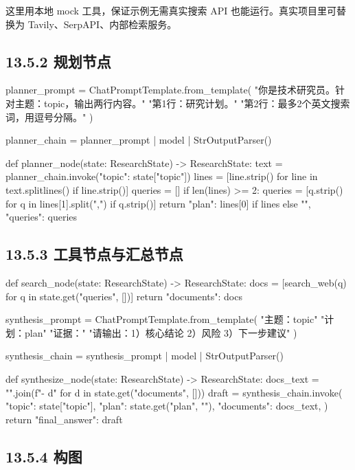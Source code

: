 这里用本地 mock 工具，保证示例无需真实搜索 API 也能运行。真实项目里可替换为 Tavily、SerpAPI、内部检索服务。


\subsection{13.5.2 规划节点}

\begin{codeblock}
planner_prompt = ChatPromptTemplate.from_template(
    "你是技术研究员。针对主题：{topic}，输出两行内容。\n"
    "第1行：研究计划。\n"
    "第2行：最多2个英文搜索词，用逗号分隔。"
)

planner_chain = planner_prompt | model | StrOutputParser()

def planner_node(state: ResearchState) -> ResearchState:
    text = planner_chain.invoke({"topic": state["topic"]})
    lines = [line.strip() for line in text.splitlines() if line.strip()]
    queries = []
    if len(lines) >= 2:
        queries = [q.strip() for q in lines[1].split(",") if q.strip()]
    return {"plan": lines[0] if lines else "", "queries": queries}
\end{codeblock}

\subsection{13.5.3 工具节点与汇总节点}

\begin{codeblock}
def search_node(state: ResearchState) -> ResearchState:
    docs = [search_web(q) for q in state.get("queries", [])]
    return {"documents": docs}

synthesis_prompt = ChatPromptTemplate.from_template(
    "主题：{topic}\n"
    "计划：{plan}\n"
    "证据：\n\n"
    "请输出：1）核心结论 2）风险 3）下一步建议"
)

synthesis_chain = synthesis_prompt | model | StrOutputParser()

def synthesize_node(state: ResearchState) -> ResearchState:
    docs_text = "\n".join(f"- {d}" for d in state.get("documents", []))
    draft = synthesis_chain.invoke({
        "topic": state["topic"],
        "plan": state.get("plan", ""),
        "documents": docs_text,
    })
    return {"final_answer": draft}
\end{codeblock}

\subsection{13.5.4 构图}

